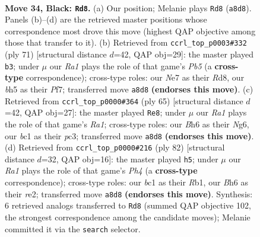 \documentclass[11pt]{article}
\begin{document}
\clearpage

\begin{figure}[p]\centering
\begin{subfigure}{0.46\textwidth}\centering
\resizebox{\linewidth}{!}{%
\newchessgame
\chessboard[
  setfen={r5k1/p3n3/Pp5b/5p1B/4pP2/8/8/1RB1K3 b - - 1 34},
  showmover=false,
  pgfstyle=straightmove, color=movearrow, markmove={a8-d8}
]}
\caption{}
\end{subfigure}\hfill
\begin{subfigure}{0.46\textwidth}\centering
\resizebox{\linewidth}{!}{%
\newchessgame
\chessboard[
  setfen={3r1k2/5pp1/2p5/p1P2P2/1p2B1R1/7P/4K3/8 b - - 0 36},
  showmover=false,
  pgfstyle=straightmove, color=movearrow, markmove={b4-b3}
]}
\caption{}
\end{subfigure}
\\[4pt]
\begin{subfigure}{0.46\textwidth}\centering
\resizebox{\linewidth}{!}{%
\newchessgame
\chessboard[
  setfen={r5k1/1p2P2p/p2p2n1/6B1/2P5/2PR4/P7/7K b - - 2 33},
  showmover=false,
  pgfstyle=straightmove, color=movearrow, markmove={a8-e8}
]}
\caption{}
\end{subfigure}\hfill
\begin{subfigure}{0.46\textwidth}\centering
\resizebox{\linewidth}{!}{%
\newchessgame
\chessboard[
  setfen={8/1p6/1bp5/p4k2/P6P/2P3K1/1P2r3/1R3N2 w - - 4 42},
  showmover=false,
  pgfstyle=straightmove, color=movearrow, markmove={h4-h5}
]}
\caption{}
\end{subfigure}
\caption{\textbf{Move 34, Black: \texttt{Rd8}.} (a) Our position; Melanie plays \texttt{Rd8} (\texttt{a8d8}). Panels (b)--(d) are the retrieved master positions whose correspondence most drove this move (highest QAP objective among those that transfer to it). (b) Retrieved from \texttt{ccrl\_top\_p0003\#332} (ply 71) [structural distance $d$=42, QAP obj=29]: the master played \texttt{b3}; under $\mu$ our \emph{Ra1} plays the role of that game's \emph{Pb5} (a \textbf{cross-type} correspondence); cross-type roles: our \emph{N}e7 as their \emph{R}d8, our \emph{b}h5 as their \emph{P}f7; transferred move \texttt{a8d8} \textbf{(endorses this move)}. (c) Retrieved from \texttt{ccrl\_top\_p0000\#364} (ply 65) [structural distance $d$=42, QAP obj=27]: the master played \texttt{Re8}; under $\mu$ our \emph{Ra1} plays the role of that game's \emph{Ra1}; cross-type roles: our \emph{B}h6 as their \emph{N}g6, our \emph{b}c1 as their \emph{p}c3; transferred move \texttt{a8d8} \textbf{(endorses this move)}. (d) Retrieved from \texttt{ccrl\_top\_p0000\#216} (ply 82) [structural distance $d$=32, QAP obj=16]: the master played \texttt{h5}; under $\mu$ our \emph{Ra1} plays the role of that game's \emph{Ph4} (a \textbf{cross-type} correspondence); cross-type roles: our \emph{b}c1 as their \emph{R}b1, our \emph{B}h6 as their \emph{r}e2; transferred move \texttt{a8d8} \textbf{(endorses this move)}. Synthesis: 6 retrieved analogs transferred to \texttt{Rd8} (summed QAP objective 102, the strongest correspondence among the candidate moves); Melanie committed it via the \texttt{search} selector.}
\label{fig:thought-m67}
\end{figure}
\end{document}
